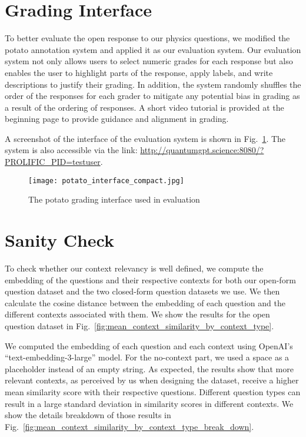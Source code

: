 \documentclass{article}
\begin{document}
\section{Grading Interface}
To better evaluate the open response to our physics questions, we modified the potato annotation system \citep{pei2022potato} and applied it as our evaluation system. Our evaluation system not only allows users to select numeric grades for each response but also enables the user to highlight parts of the response, apply labels, and write descriptions to justify their grading. In addition, the system randomly shuffles the order of the responses for each grader to mitigate any potential bias in grading as a result of the ordering of responses. A short video tutorial is provided at the beginning page to provide guidance and alignment in grading.

A screenshot of the interface of the evaluation system is shown in Fig.~\ref{fig:potato_interface}. The system is also accessible via the link: \href{http://quantumgpt.science:8080/?PROLIFIC_PID=testuser}{\url{http://quantumgpt.science:8080/?PROLIFIC_PID=testuser}}.

\begin{figure}[b!]
    \centering
    \texttt{[image: potato\_interface\_compact.jpg]}
    \caption{The potato grading interface used in evaluation} 
    \label{fig:potato_interface}
\end{figure}

\section{Sanity Check}

    To check whether our context relevancy is well defined, we compute the embedding of the questions and their respective contexts for both our open-form question dataset and the two closed-form question datasets we use. We then calculate the cosine distance between the embedding of each question and the different contexts associated with them. We show the results for the open question dataset in Fig.~\ref{fig:mean_context_similarity_by_context_type}.

    We computed the embedding of each question and each context using OpenAI's ``text-embedding-3-large'' model. For the no-context part, we used a space as a placeholder instead of an empty string. 
    As expected, the results show that more relevant contexts, as perceived by us when designing the dataset, receive a higher mean similarity score with their respective questions. Different question types can result in a large standard deviation in similarity scores in different contexts.
    We show the details breakdown of those results in Fig.~\ref{fig:mean_context_similarity_by_context_type_break_down}.
\end{document}
